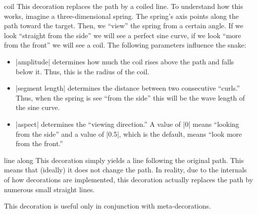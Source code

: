 \begin{decoration}{coil}
  This decoration replaces the path by a coiled line. To understand how this works,
  imagine a three-dimensional spring. The spring's axis points along
  the path toward the target. Then, we ``view'' the spring from a
  certain angle. If we look ``straight from the side'' we will see a
  perfect sine curve, if we look ``more from the front'' we will see a
  coil. The following parameters influence the snake:  
  \begin{itemize}
  \item |amplitude|
    determines how much the coil rises above the path and falls below
    it. Thus, this is the radius of the coil.
  \item |segment length|
    determines the distance between two consecutive ``curls.'' Thus,
    when the spring is see ``from the side'' this will be the wave
    length of the sine curve. 
  \item |aspect|
    determines the ``viewing direction.'' A value of |0| means
    ``looking from the side'' and a value of |0.5|, which is the
    default, means ``look more from the front.'' 
  \end{itemize}
\begin{codeexample}[]
\end{codeexample}
\begin{codeexample}[]
\end{codeexample}
\end{decoration}



\begin{decoration}{line along}
  This decoration simply yields a line following the original
  path. This means that (ideally) it does not change the path. In
  reality, due to the internals of how decorations are implemented,
  this decoration actually replaces the path by numerous small
  straight lines.

  This decoration is useful only in conjunction with
  meta-decorations. 

\begin{codeexample}[]
\end{codeexample}
\end{decoration}



